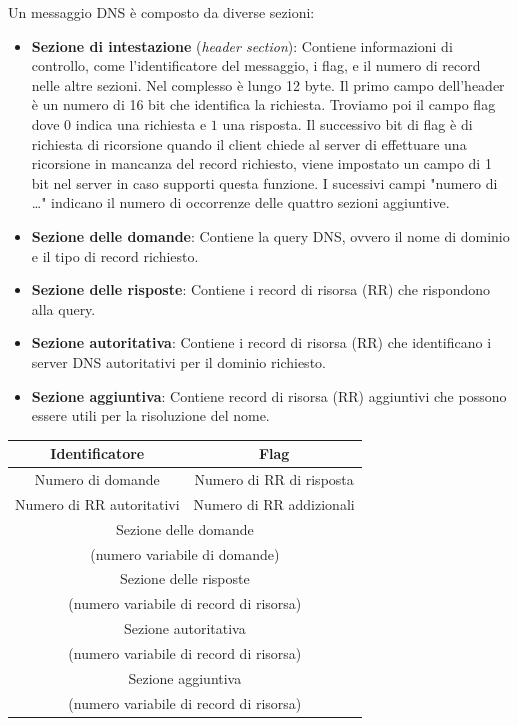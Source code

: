 Un messaggio DNS è composto da diverse sezioni:
\begin{itemize}
    \item \textbf{Sezione di intestazione} (\textit{header section}): Contiene informazioni di controllo, come l'identificatore del messaggio, i flag, e il numero di record nelle altre sezioni. Nel complesso è lungo 12 byte. Il primo campo dell'header è un numero di 16 bit che identifica la richiesta. Troviamo poi il campo flag dove $0$ indica una richiesta e $1$ una risposta. Il successivo bit di flag è di richiesta di ricorsione quando il client chiede al server di effettuare una ricorsione in mancanza del record richiesto, viene impostato un campo di 1 bit nel server in caso supporti questa funzione. I sucessivi campi "numero di \dots" indicano il numero di occorrenze delle quattro sezioni aggiuntive. 
    \item \textbf{Sezione delle domande}: Contiene la query DNS, ovvero il nome di dominio e il tipo di record richiesto.
    \item \textbf{Sezione delle risposte}: Contiene i record di risorsa (RR) che rispondono alla query.
    \item \textbf{Sezione autoritativa}: Contiene i record di risorsa (RR) che identificano i server DNS autoritativi per il dominio richiesto.
    \item \textbf{Sezione aggiuntiva}: Contiene record di risorsa (RR) aggiuntivi che possono essere utili per la risoluzione del nome.
\end{itemize}

\begin{center}
  \begin{tabular}{|c|c}
    \hline
    \multicolumn{1}{|c|}{Identificatore} & \multicolumn{1}{c|}{Flag} \\
    \hline
    \multicolumn{1}{|c|}{Numero di domande} & \multicolumn{1}{c|}{Numero di RR di risposta} \\
    \hline
    \multicolumn{1}{|c|}{Numero di RR autoritativi} & \multicolumn{1}{c|}{Numero di RR addizionali} \\
    \hline \hline
    \multicolumn{2}{|c|}{Sezione delle domande} \\ 
    \multicolumn{2}{|c|}{(numero variabile di domande)} \\ 
    \hline
    \multicolumn{2}{|c|}{Sezione delle risposte} \\ 
    \multicolumn{2}{|c|}{(numero variabile di record di risorsa)} \\ 
    \hline
    \multicolumn{2}{|c|}{Sezione autoritativa} \\ 
    \multicolumn{2}{|c|}{(numero variabile di record di risorsa)} \\ 
    \hline
    \multicolumn{2}{|c|}{Sezione aggiuntiva} \\
    \multicolumn{2}{|c|}{(numero variabile di record di risorsa)} \\ 
    \hline
  \end{tabular}
\hspace{0.5cm}
\end{center}


